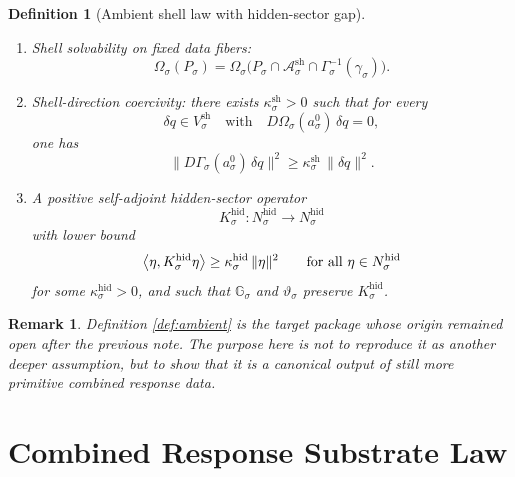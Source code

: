 \documentclass[11pt]{article}
\newcommand{\ForSpace}[1]{\mathcal I_{#1}^{\mathrm{for}}}
\newcommand{\AmbientBody}[1]{P_{#1}}
\newcommand{\AmbientRead}[1]{\Omega_{#1}}
\newcommand{\AmbientShellLaw}[1]{\Gamma_{#1}}
\newcommand{\AmbientValue}[1]{\gamma_{#1}}
\newcommand{\AmbientSym}[1]{\mathbb G_{#1}}
\newcommand{\AmbientTime}[1]{\vartheta_{#1}}
\newcommand{\ShellAffine}[1]{\mathcal A_{#1}^{\mathrm{sh}}}
\newcommand{\ShellVector}[1]{V_{#1}^{\mathrm{sh}}}
\newcommand{\HiddenSpace}[1]{N_{#1}^{\mathrm{hid}}}
\newcommand{\HiddenOperator}[1]{K_{#1}^{\mathrm{hid}}}
\newcommand{\AmbientRef}[1]{a_{#1}^{0}}
\newtheorem{definition}{Definition}
\newtheorem{remark}{Remark}
\begin{document}
\begin{definition}[Ambient shell law with hidden-sector gap]
\begin{enumerate}
    for every \(w\in\ForSpace{\sigma}\).
    \item Shell solvability on fixed data fibers:
    \begin{equation}
    \AmbientRead{\sigma}(\AmbientBody{\sigma})
    =
    \AmbientRead{\sigma}
    \bigl(
    \AmbientBody{\sigma}\cap
    \ShellAffine{\sigma}\cap
    \AmbientShellLaw{\sigma}^{-1}(\AmbientValue{\sigma})
    \bigr).
    \label{eq:ambientsolvability}
    \end{equation}
    \item Shell-direction coercivity: there exists \(\kappa_{\sigma}^{\mathrm{sh}}>0\) such that for every
    \[
    \delta q\in \ShellVector{\sigma}
    \quad\text{with}\quad
    D\AmbientRead{\sigma}(\AmbientRef{\sigma})\,\delta q=0,
    \]
    one has
    \begin{equation}
    \bigl\|
    D\AmbientShellLaw{\sigma}(\AmbientRef{\sigma})\,\delta q
    \bigr\|^{2}
    \ge
    \kappa_{\sigma}^{\mathrm{sh}}\,
    \|\delta q\|^{2}.
    \label{eq:shellcoercive}
    \end{equation}
    \item A positive self-adjoint hidden-sector operator
    \[
    \HiddenOperator{\sigma}:\HiddenSpace{\sigma}\to\HiddenSpace{\sigma}
    \]
    with lower bound
    \begin{equation}
    \ev{\eta,\HiddenOperator{\sigma}\eta}
    \ge
    \kappa_{\sigma}^{\mathrm{hid}}\,
    \|\eta\|^{2}
    \qquad
    \text{for all }\eta\in\HiddenSpace{\sigma}
    \label{eq:hiddengap}
    \end{equation}
    for some \(\kappa_{\sigma}^{\mathrm{hid}}>0\), and such that \(\AmbientSym{\sigma}\) and \(\AmbientTime{\sigma}\) preserve \(\HiddenOperator{\sigma}\).
\end{enumerate}
\end{definition}

\begin{remark}
Definition \ref{def:ambient} is the target package whose origin remained open after the previous note. The purpose here is not to reproduce it as another deeper assumption, but to show that it is a canonical output of still more primitive combined response data.
\end{remark}

\section{Combined Response Substrate Law}
\end{document}
